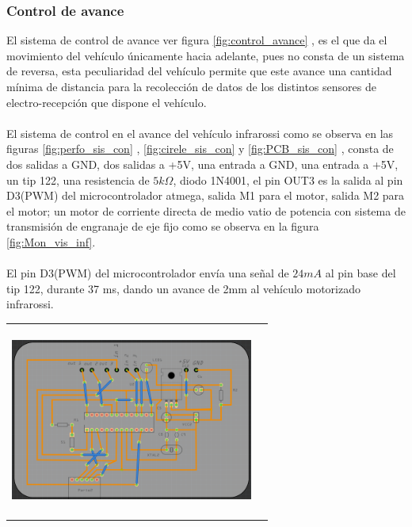 \documentclass[12]{article}
\newenvironment{Figure}
{\par\medskip\noindent\minipage{\linewidth}}
{\endminipage\par\medskip}
\begin{document}
\begin{multicols}{2}
\subsubsection{Control de avance}
El sistema de control de avance ver figura \ref{fig:control_avance}  , es el que da el movimiento del vehículo únicamente hacia adelante, pues no consta de un sistema de reversa, esta peculiaridad del vehículo permite que este avance una cantidad mínima de distancia para la recolección de datos de los distintos sensores de electro-recepción que dispone el vehículo. \\ \\
El sistema de control en el avance del vehículo infrarossi como se observa en las figuras \ref{fig:perfo_sis_con} , \ref{fig:cirele_sis_con} y \ref{fig:PCB_sis_con} , consta de dos salidas a GND, dos salidas a +5V, una entrada a GND, una entrada a +5V, un tip 122, una resistencia de $5k\Omega$, diodo 1N4001, el pin OUT3 es la salida al pin D3(PWM) del microcontrolador atmega, salida M1 para el motor, salida M2 para el motor; un motor de corriente directa de medio vatio de potencia con sistema de transmisión de engranaje de eje fijo como se observa en la figura \ref{fig:Mon_vis_inf}.\\\\
El pin D3(PWM) del microcontrolador envía una señal de $24mA$ al pin base del tip\cite{TIP122} 122, durante 37 ms, dando un avance de 2mm al vehículo motorizado infrarossi.
\begin{Figure}
\center
\begin{tabular}{|l|r|}
\hline
\\
\includegraphics[width=8cm, height=6cm]{img/H3.png}  \\\\ \hline
\end{tabular}
\label{fig:Esq_PCB_final}
\end{Figure}



\end{multicols}
\end{document}
